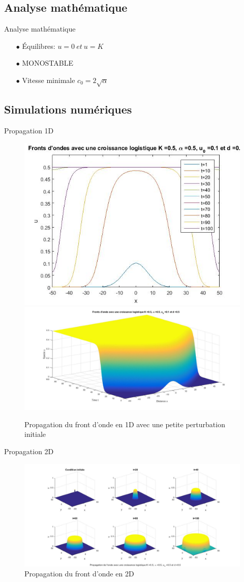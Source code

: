 \documentclass[10pt]{beamer}
\begin{document}
\subsection{Analyse mathématique}
\begin{frame}{Analyse mathématique}{}
\begin{itemize}
	\item[$\bullet$] Équilibres: $u=0 {\ et\ } u=K$
	\item[$\bullet$] MONOSTABLE
	\item[$\bullet$] Vitesse minimale $c_0=2\sqrt{\alpha}$
\end{itemize}
\end{frame}

\subsection{Simulations numériques}
\begin{frame}{Propagation 1D}{}
\begin{figure}[H]
	\centering
	\includegraphics[width=0.45\linewidth]{SimulationKPP/TrigerEffect/fronts}\hfill
	\includegraphics[width=0.55\linewidth]{SimulationKPP/TrigerEffect/Surf}\hfill
	\caption{Propagation du front d'onde en 1D avec une petite perturbation initiale}
\end{figure}
\end{frame}

\begin{frame}{Propagation 2D}{}
\begin{figure}[H]
	\centering
	\includegraphics[width=1\linewidth]{SimulationKPP/KPP13}
    \caption{Propagation du front d'onde en 2D }
\end{figure}
\end{frame}
\end{document}
